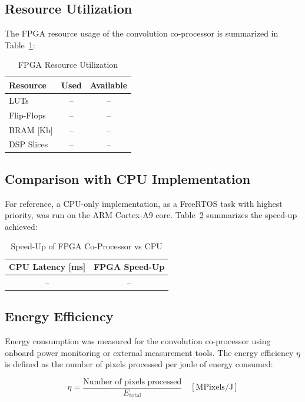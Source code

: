 \documentclass[conference]{IEEEtran}
\begin{document}
\subsection{Resource Utilization}

The FPGA resource usage of the convolution co-processor is summarized in Table~\ref{tab:resource-util}:

\begin{table}[H]
\centering
\caption{FPGA Resource Utilization}
\begin{tabular}{l c c}
\hline
Resource & Used & Available \\
\hline
LUTs & -- & -- \\
Flip-Flops & -- & -- \\
BRAM [Kb] & -- & -- \\
DSP Slices & -- & -- \\
\hline
\end{tabular}
\label{tab:resource-util}
\end{table}

\subsection{Comparison with CPU Implementation}

For reference, a CPU-only implementation, as a FreeRTOS task with highest priority, was run on the ARM Cortex-A9 core. Table~\ref{tab:cpu-vs-fpga} summarizes the speed-up achieved:

\begin{table}[H]
\centering
\caption{Speed-Up of FPGA Co-Processor vs CPU}
\begin{tabular}{c c}
\hline
CPU Latency [ms] & FPGA Speed-Up \\
\hline
-- & -- \\
\hline
\end{tabular}
\label{tab:cpu-vs-fpga}
\end{table}

\subsection{Energy Efficiency}

Energy consumption was measured for the convolution co-processor using onboard power monitoring or external measurement tools. The energy efficiency $\eta$ is defined as the number of pixels processed per joule of energy consumed:

\begin{equation}
\eta = \frac{\text{Number of pixels processed}}{E_\text{total}} \quad [\text{MPixels/J}]
\end{equation}
\end{document}

